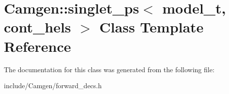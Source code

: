 \hypertarget{a00510}{}\section{Camgen\+:\+:singlet\+\_\+ps$<$ model\+\_\+t, cont\+\_\+hels $>$ Class Template Reference}
\label{a00510}


The documentation for this class was generated from the following file\+:\begin{DoxyCompactItemize}
\item 
include/\+Camgen/forward\+\_\+decs.\+h\end{DoxyCompactItemize}
